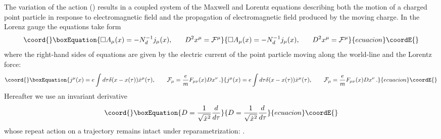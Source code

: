 \documentclass[a4paper,12pt]{article}
\begin{document}
The variation of the action (\myHighlight{$\ref{act}$}\coordHE{}) results in a coupled system of the
Maxwell and Lorentz equations describing both the motion of a charged point
particle in response to electromagnetic field and the propagation of
electromagnetic field produced by the moving charge. In the Lorenz gauge \coordHE{} the equations take form
\begin{equation}\coord{}\boxEquation{
\square A_\mu (x)=-N_d^{-1}j_\mu (x),\,\,\,\,\;\;\;\;D^2x^\mu ={\cal F}^\mu
\label{eq}
}{
\square A_\mu (x)=-N_d^{-1}j_\mu (x),\,\,\,\,\;\;\;\;D^2x^\mu ={\cal F}^\mu
}{ecuacion}\coordE{}\end{equation}
where the right-hand sides of equations are given by the electric current of
the point particle moving along the world-line \coordHE{} and the
Lorentz force:
\begin{equation}\coord{}\boxEquation{
j^\mu (x)=e\int {d\tau \delta (x-x(\tau ))\dot x^\mu (\tau )}
,\,\,\,\,\,\;\;\;\;{\cal F}_\mu =\frac emF_{\mu \nu }(x)Dx^\nu \,.
\label{jf}
}{
j^\mu (x)=e\int {d\tau \delta (x-x(\tau ))\dot x^\mu (\tau )}
,\,\,\,\,\,\;\;\;\;{\cal F}_\mu =\frac emF_{\mu \nu }(x)Dx^\nu \,.
}{ecuacion}\coordE{}\end{equation}
Hereafter we use an invariant derivative
\begin{equation}\coord{}\boxEquation{
D=\frac 1{\sqrt{\dot x^2}}\frac d{d\tau }  \label{der}
}{
D=\frac 1{\sqrt{\dot x^2}}\frac d{d\tau }  }{ecuacion}\coordE{}\end{equation}
whose repeat action \coordHE{} on a trajectory remains intact under
reparametrization: \myHighlight{$\tau \rightarrow \tau ^{\prime }(\tau )$}\coordHE{}.
\end{document}
